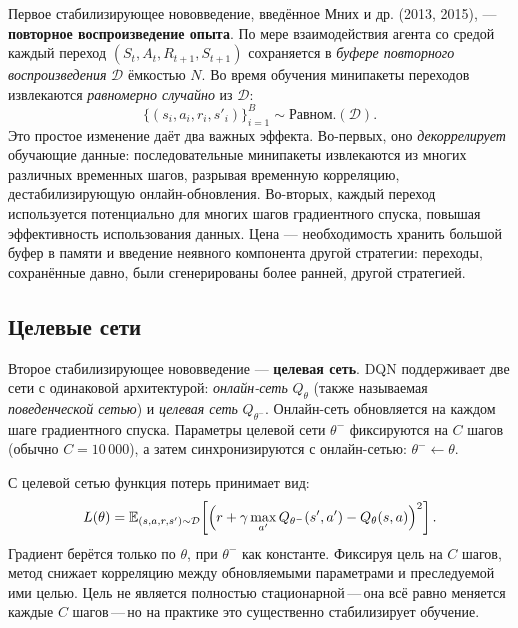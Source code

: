 Первое стабилизирующее нововведение, введённое Мних и др. (2013, 2015), --- \textbf{повторное воспроизведение опыта}.  По мере взаимодействия агента со средой каждый переход $(S_t, A_t, R_{t+1}, S_{t+1})$ сохраняется в \emph{буфере повторного воспроизведения} $\mathcal{D}$ ёмкостью $N$.  Во время обучения минипакеты переходов извлекаются \emph{равномерно случайно} из $\mathcal{D}$:
\begin{equation}
\label{eq:replay-sampling}
\{(s_i, a_i, r_i, s'_i)\}_{i=1}^B \sim \mbox{Равном.}(\mathcal{D}).
\end{equation}
Это простое изменение даёт два важных эффекта.  Во-первых, оно \emph{декоррелирует} обучающие данные: последовательные минипакеты извлекаются из многих различных временных шагов, разрывая временную корреляцию, дестабилизирующую онлайн-обновления.  Во-вторых, каждый переход используется потенциально для многих шагов градиентного спуска, повышая эффективность использования данных.  Цена --- необходимость хранить большой буфер в памяти и введение неявного компонента другой стратегии: переходы, сохранённые давно, были сгенерированы более ранней, другой стратегией.

\subsection{Целевые сети}
\label{subsec:target-networks}

Второе стабилизирующее нововведение --- \textbf{целевая сеть}.  DQN поддерживает две сети с одинаковой архитектурой: \emph{онлайн-сеть} $Q_\theta$ (также называемая \emph{поведенческой сетью}) и \emph{целевая сеть} $Q_{\theta^-}$.  Онлайн-сеть обновляется на каждом шаге градиентного спуска.  Параметры целевой сети $\theta^-$ фиксируются на $C$ шагов (обычно $C = 10\,000$), а затем синхронизируются с онлайн-сетью: $\theta^- \leftarrow \theta$.

С целевой сетью функция потерь принимает вид:
\begin{equation}
\label{eq:dqn-loss}
L(\theta) = \operatorname{\mathbb{E}}_{(s,a,r,s') \sim \mathcal{D}}\!\left[
\Bigl(r + \gamma \max_{a'} Q_{\theta^-}(s', a') - Q_\theta(s, a)\Bigr)^2
\right].
\end{equation}
Градиент берётся только по $\theta$, при $\theta^-$ как константе.  Фиксируя цель на $C$ шагов, метод снижает корреляцию между обновляемыми параметрами и преследуемой ими целью.  Цель не является полностью стационарной\,---\,она всё равно меняется каждые $C$ шагов\,---\,но на практике это существенно стабилизирует обучение.


